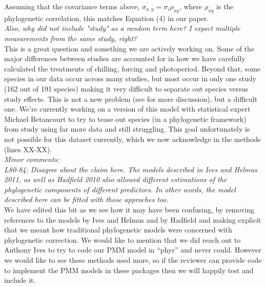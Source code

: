 \documentclass[11pt]{article}
\begin{document}
Assuming that the covariance terms above, $\sigma_{x,y}=\sigma_i \rho_{xy}$, where $\rho_{xy}$ is the phylogenetic correlation, this matches Equation (4) in our paper.\\

\emph{Also, why did not include "study" as a random term here? I expect multiple measurements from the same study, right?}\\

This is a great question and something we are actively working on. Some of the major differences between studies are accounted for in how we have carefully calculated the treatments of chilling, forcing and photoperiod. Beyond that, some species in our data occur across many studies, but most occur in only one study (162 out of 191 species) making it very difficult to separate out species versus study effects. This is not a new problem (see \cite{kharouba2018} for more discussion), but a difficult one. We're currently working on a version of this model with statistical expert Michael Betancourt to try to tease out species (in a phylogenetic framework) from study using far more data and still struggling. This goal unfortunately is not possible for this dataset currently, which we now acknowledge in the methods (lines XX-XX). \\



\emph{Minor comments:}\\
\emph{L80-84: Disagree about the claim here. The models described in Ives and Helmus 2011, as well as Hadfield 2010 also allowed different estimations of the phylogenetic components of different predictors. In other words, the model described here can be fitted with those approches too.}\\
We have edited this bit as we see how it may have been confusing, by removing references to the models by Ives and Helmus and by Hadfield and making explicit that we meant how traditional phylogenetic models were concerned with phylogenetic correction. We would like to mention that we did reach out to Anthony Ives to try to code our PMM model in ``phyr'' and never could. However we would like to see these methods used more, so if the reviewer can provide code to implement the PMM models in these packages then we will happily test and include it.
\end{document}
